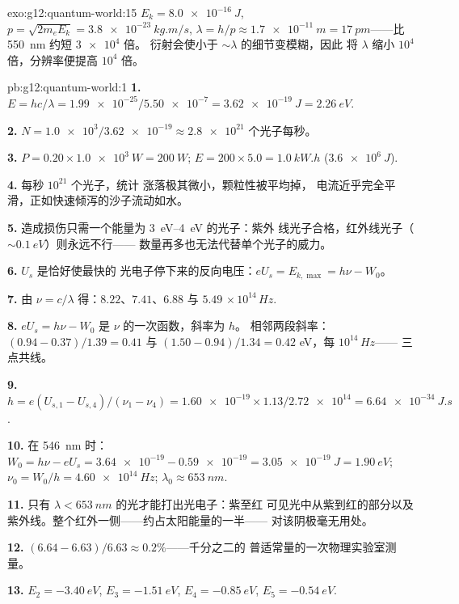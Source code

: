 \begin{solution}{exo:g12:quantum-world:15}
$E_k = \qty{8.0e-16}{J}$, $p = \sqrt{2m_e E_k} =
\qty{3.8e-23}{kg.m/s}$, $\lambda = h/p \approx \qty{1.7e-11}{m} =
\qty{17}{pm}$——比 \qty{550}{nm} 约短 $\num{3e4}$ 倍。
衍射会使小于 $\sim\lambda$ 的细节变模糊，因此
将 $\lambda$ 缩小 $10^4$ 倍，分辨率便提高 $10^4$ 倍。
\end{solution}

\begin{solution}{pb:g12:quantum-world:1}
\textbf{1.} $E = hc/\lambda = \num{1.99e-25}/\num{5.50e-7} =
\qty{3.62e-19}{J} = \qty{2.26}{eV}$.

\textbf{2.} $N = \num{1.0e3}/\num{3.62e-19} \approx \num{2.8e21}$
个光子每秒。

\textbf{3.} $P = 0.20 \times \qty{1.0e3}{W} = \qty{200}{W}$;
$E = 200 \times 5.0 = \qty{1.0}{kW.h}$ ($\qty{3.6e6}{J}$).

\textbf{4.} 每秒 $10^{21}$ 个光子，统计
涨落极其微小，颗粒性被平均掉，
电流近乎完全平滑，正如快速倾泻的沙子流动如水。

\textbf{5.} 造成损伤只需一个能量为 \qtyrange{3}{4}{eV} 的光子：紫外
线光子合格，红外线光子（$\sim \qty{0.1}{eV}$）则永远不行——
数量再多也无法代替单个光子的威力。

\textbf{6.} $U_s$ 是恰好使最快的
光电子停下来的反向电压：$eU_s = E_{k,\max} = h\nu - W_0$。

\textbf{7.} 由 $\nu = c/\lambda$ 得：$8.22$、$7.41$、$6.88$ 与 $5.49$
$\times\,10^{14}\,\unit{Hz}$.

\textbf{8.} $eU_s = h\nu - W_0$ 是 $\nu$ 的一次函数，斜率为 $h$。
相邻两段斜率：$(0.94 - 0.37)/1.39 = 0.41$ 与
$(1.50 - 0.94)/1.34 = 0.42$ \unit{eV}，每 $10^{14}\,\unit{Hz}$——
三点共线。

\textbf{9.} $h = e(U_{s,1}-U_{s,4})/(\nu_1-\nu_4) = \num{1.60e-19}
\times 1.13/\num{2.72e14} = \qty{6.64e-34}{J.s}$.

\textbf{10.} 在 \qty{546}{nm} 时：$W_0 = h\nu - eU_s = \num{3.64e-19} -
\num{0.59e-19} = \qty{3.05e-19}{J} = \qty{1.90}{eV}$;
$\nu_0 = W_0/h = \qty{4.60e14}{Hz}$; $\lambda_0 \approx \qty{653}{nm}$.

\textbf{11.} 只有 $\lambda < \qty{653}{nm}$ 的光才能打出光电子：紫至红
可见光中从紫到红的部分以及紫外线。整个红外一侧——约占太阳能量的一半——
对该阴极毫无用处。

\textbf{12.} $(6.64 - 6.63)/6.63 \approx 0.2\%$——千分之二的
普适常量的一次物理实验室测量。

\textbf{13.} $E_2 = \qty{-3.40}{eV}$, $E_3 = \qty{-1.51}{eV}$,
$E_4 = \qty{-0.85}{eV}$, $E_5 = \qty{-0.54}{eV}$.


\end{solution}
